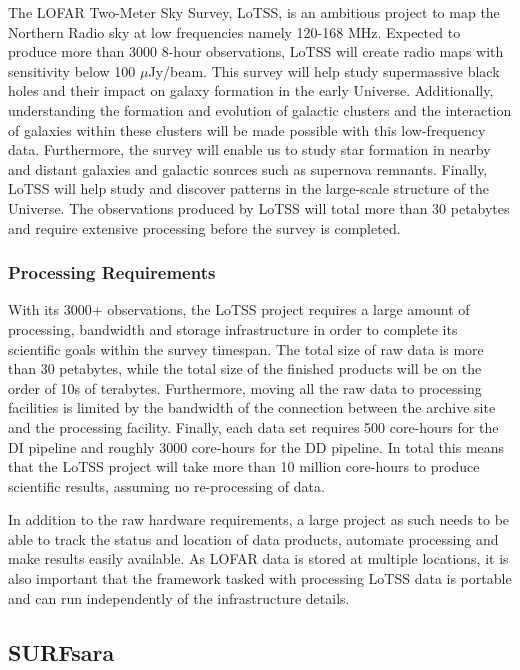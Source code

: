 The LOFAR Two-Meter Sky Survey, LoTSS, is an ambitious project to map the Northern Radio sky at low frequencies namely 120-168 MHz. Expected to produce more than 3000 8-hour observations, LoTSS will create radio maps with sensitivity below 100 $\mu$Jy/beam. This survey will help study supermassive black holes and their impact on galaxy formation in the early Universe. Additionally, understanding the formation and evolution of galactic clusters and the interaction of galaxies within these clusters will be made possible with this low-frequency data. Furthermore, the survey will enable us to study star formation in nearby and distant galaxies and galactic sources such as supernova remnants. Finally, LoTSS will help study and discover patterns in the large-scale structure of the Universe.  The observations produced by LoTSS will total more than 30 petabytes and require extensive processing before the survey is completed. 

\subsubsection{Processing Requirements}   

With its 3000+ observations, the LoTSS project requires a large amount of processing, bandwidth and storage infrastructure in order to complete its scientific goals within the survey timespan. The total size of raw data is more than 30 petabytes, while the total size of the finished products will be on the order of 10s of terabytes. Furthermore, moving all the raw data to processing facilities is limited by the bandwidth of the connection between the archive site and the processing facility. Finally, each data set requires 500 core-hours for the DI pipeline and roughly 3000 core-hours for the DD pipeline. In total this means that the LoTSS project will take more than 10 million core-hours to produce scientific results, assuming no re-processing of data. 
 
In addition to the raw hardware requirements, a large project as such needs to be able to track the status and location of data products, automate processing and make results easily available. As LOFAR data is stored at multiple locations, it is also important that the framework tasked with processing LoTSS data is portable and can run independently of the infrastructure details.

\subsection{SURFsara} 

